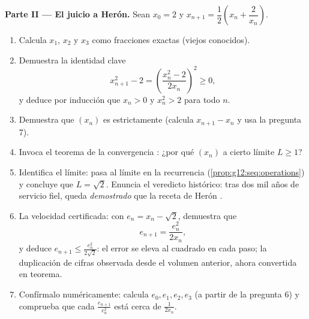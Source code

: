 \begin{problem}
\medskip
\noindent\textbf{Parte II --- El juicio a Herón.}
Sean $x_0 = 2$ y $x_{n+1} = \dfrac12\left(x_n + \dfrac{2}{x_n}\right)$.
\begin{enumerate}[resume]
  \item Calcula $x_1$, $x_2$ y $x_3$ como fracciones exactas (viejos
        conocidos).
  \item Demuestra la identidad clave
        \[
        x_{n+1}^2 - 2 = \left(\frac{x_n^2 - 2}{2x_n}\right)^{\!2}
        \geq 0,
        \]
        y deduce por inducción que $x_n > 0$ y $x_n^2 > 2$ para todo $n$.
  \item Demuestra que $(x_n)$ es estrictamente  (calcula
        $x_{n+1} - x_n$ y usa la pregunta 7).
  \item Invoca el teorema de la convergencia : ¿por qué 
        $(x_n)$ a cierto límite $L \geq 1$?
  \item Identifica el límite: pasa al límite en la recurrencia
        (\cref{prop:g12:seq:operations}) y concluye que $L = \sqrt2$.
        Enuncia el veredicto histórico: tras dos mil años de servicio fiel,
        queda \emph{demostrado} que la receta de Herón .
  \item La velocidad certificada: con $e_n = x_n - \sqrt2$, demuestra que
        \[
        e_{n+1} = \frac{e_n^2}{2 x_n} ,
        \]
        y deduce $e_{n+1} \leq \frac{e_n^2}{2\sqrt2}$: el error se eleva al
        cuadrado en cada paso; la duplicación de cifras observada desde el
        volumen anterior, ahora convertida en teorema.
  \item Confírmalo numéricamente: calcula $e_0, e_1, e_2, e_3$ (a partir de
        la pregunta 6) y comprueba que cada $\frac{e_{n+1}}{e_n^2}$ está
        cerca de $\frac{1}{2x_n}$.
\end{enumerate}


\end{problem}
